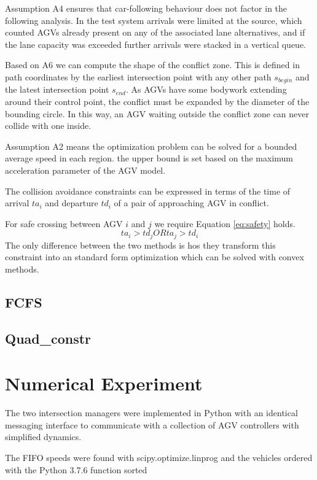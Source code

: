 \documentclass[11pt]{article} %
\begin{document}
Assumption A4 ensures that car-following behaviour does not factor in the following analysis. In the test system arrivals were limited at the source, which counted AGVs already present on any of the associated lane alternatives, and if the lane capacity was exceeded further arrivals were stacked in a vertical queue.    

Based on A6 we can compute the shape of the conflict zone. This is defined in path coordinates by the earliest intersection point with any other path $s_{begin}$ and the latest intersection point $s_{end}$. As AGVs have some bodywork extending around their control point, the conflict must be expanded by the diameter of the bounding circle. In this way, an AGV waiting outside the conflict zone can never collide with one inside. 

Assumption A2 means the optimization problem can  be solved for a bounded average speed in each region. the upper bound is set based on the maximum acceleration parameter of the AGV model.

The collision avoidance constraints can be expressed in terms of the time of arrival $ta_i$ and departure $td_i$ of a pair of approaching AGV in conflict.

For safe crossing between AGV $i$ and $j$ we require Equation \ref{eq:safety} holds.
\begin{equation}
\label{eq:safety}
ta_i > td_j OR ta_j > td_i
\end{equation}
The only difference between the two methods is hos they transform this constraint into an standard form optimization which can be solved with convex methods.
 
\subsection{FCFS}

\subsection{Quad\_constr}
    

\section{Numerical Experiment}
The two intersection managers were implemented in Python with an identical messaging interface to communicate with a collection of AGV controllers with simplified dynamics. 

The FIFO speeds were found with scipy.optimize.linprog and the vehicles ordered with the Python 3.7.6 function sorted
\end{document}
